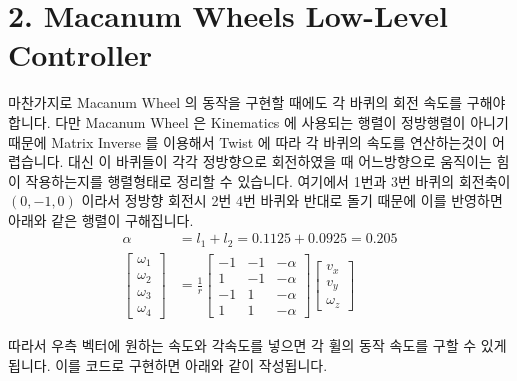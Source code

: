 \documentclass{article}
\begin{document}
\section*{2. Macanum Wheels Low-Level Controller}
마찬가지로 Macanum Wheel 의 동작을 구현할 때에도 각 바퀴의 회전 속도를 구해야 합니다. 다만 Macanum Wheel 은 Kinematics 에 사용되는 행렬이 정방행렬이 아니기 때문에 Matrix Inverse 를 이용해서 Twist 에 따라 각 바퀴의 속도를 연산하는것이 어렵습니다. 대신 이 바퀴들이 각각 정방향으로 회전하였을 때 어느방향으로 움직이는 힘이 작용하는지를 행렬형태로 정리할 수 있습니다. 여기에서 1번과 3번 바퀴의 회전축이 $(0, -1, 0)$ 이라서 정방향 회전시 2번 4번 바퀴와 반대로 돌기 때문에 이를 반영하면 아래와 같은 행렬이 구해집니다.
\begin{align*}
\alpha &= l_{1} + l_{2} = 0.1125 + 0.0925 = 0.205 \\
\begin{bmatrix}
\omega_{1} \\ \omega_{2} \\ \omega_{3} \\ \omega_{4}
\end{bmatrix} &= \frac{1}{r}\begin{bmatrix}
-1 & -1 & -\alpha \\
1 & -1 & -\alpha \\
-1 & 1 & -\alpha \\
1 & 1 & -\alpha
\end{bmatrix}\begin{bmatrix}
v_{x} \\ v_{y} \\ \omega_{z}
\end{bmatrix}
\end{align*}

따라서 우측 벡터에 원하는 속도와 각속도를 넣으면 각 휠의 동작 속도를 구할 수 있게 됩니다.
이를 코드로 구현하면 아래와 같이 작성됩니다.
\end{document}
